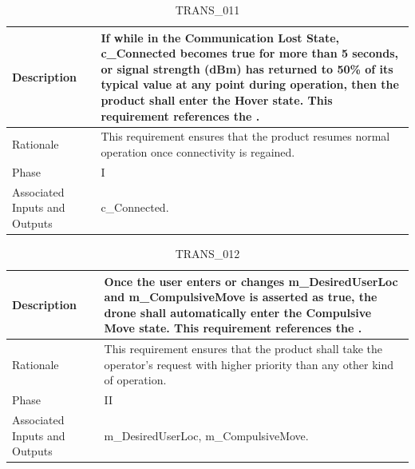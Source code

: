 \documentclass{article}
\begin{document}
\begin{table}[!h]
\begin{center}
\caption {TRANS\_011} 
\label{TRANS_011}
\begin{tabular}{ | m{3cm} | m{11cm} | }
\hline
Description & If while in the Communication Lost State, c\_Connected becomes true for more than 5 seconds, or signal strength (dBm) has returned to 50\% of its typical value at any point during operation, then the product shall enter the Hover state. This requirement references the \nameref{Communication Lost State}. \\
\hline
Rationale & This requirement ensures that the product resumes normal operation once connectivity is regained. \\
\hline
Phase & I \\
\hline
Associated Inputs and Outputs & c\_Connected. \\
\hline
\end{tabular}
\end{center}
\end{table}

\begin{table}[!h]
\begin{center}
\caption {TRANS\_012} 
\label{TRANS_012}
\begin{tabular}{ | m{3cm} | m{11cm} | }
\hline
Description & Once the user enters or changes m\_DesiredUserLoc and m\_CompulsiveMove is asserted as true, the drone shall automatically enter the Compulsive Move state. This requirement references the \nameref{Compulsive Move State}. \\
\hline
Rationale & This requirement ensures that the product shall take the operator's request with higher priority than any other kind of operation. \\
\hline
Phase & II \\
\hline
Associated Inputs and Outputs & m\_DesiredUserLoc, m\_CompulsiveMove. \\
\hline
\end{tabular}
\end{center}
\end{table}
\end{document}
